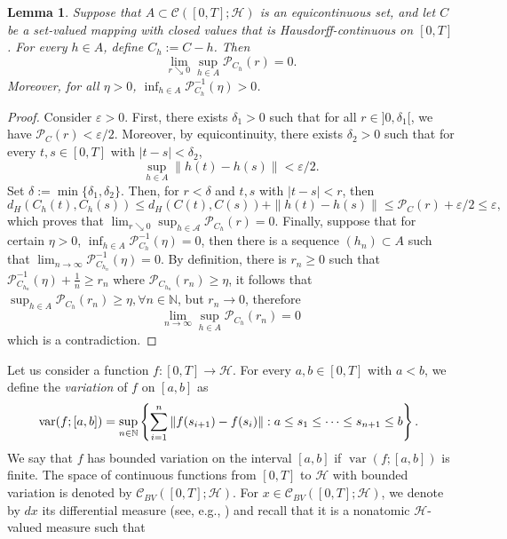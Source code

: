 \documentclass[preprint,12pt]{elsarticle}
\renewcommand{\epsilon}{\varepsilon}
\renewcommand{\H}{\mathcal{H}}
\newcommand{\N}{\mathbb{N}}
\theoremstyle{plain}
\newtheorem{lemma}[theorem]{Lemma}
\theoremstyle{definition}
\theoremstyle{remark}
\begin{document}
    \begin{lemma}\label{lem-equi-mc}
		Suppose that $A\subset \mathcal{C}([0,T];\H)$ is an equicontinuous set, and let $C$ be a set-valued mapping with closed values that is Hausdorff-continuous on $[0,T]$. For every $h\in A$, define $C_h := C-h$. Then $$\lim_{r\searrow 0}\sup_{h\in A}\mathscr{P}_{C_h}(r) = 0.$$
        Moreover, for all $\eta>0$, $\displaystyle\inf_{h\in A} \mathscr{P}_{C_h}^{-1}(\eta)>0$.
	\end{lemma}
	\begin{proof}
	Consider $\epsilon>0$. First, there exists $\delta_1>0$ such that for all $r\in ]0,\delta_1[$, we have $\mathscr{P}_C(r)<\epsilon/2$. Moreover, by equicontinuity, there exists $\delta_2>0$ such that for every $t,s\in [0,T]$ with $|t-s|<\delta_2$, $$\sup_{h\in A}\|h(t)-h(s)\|<\epsilon/2.$$
    Set $\delta:=\min\{\delta_1,\delta_2\}$. Then, for $r<\delta$ and $t,s$ with $|t-s|< r$, then
		\begin{equation*}
			d_H(C_h(t),C_h(s)) \leq d_H(C(t),C(s)) + \|h(t)-h(s)\|
			\leq \mathscr{P}_C(r) + \epsilon/2\leq \epsilon,
		\end{equation*}
		which proves that $\displaystyle\lim_{r\searrow 0}\sup_{h\in \mathcal{A}}\mathscr{P}_{C_h}(r) = 0$. Finally, suppose that for certain $\eta>0$, $\inf_{h\in A} \mathscr{P}_{C_h}^{-1}(\eta)=0$, then there is a sequence $(h_n)\subset A$ such that $\displaystyle\lim_{n\to \infty}\mathscr{P}_{C_{h_n}}^{-1}(\eta)=0$. By definition, there is $r_n\geq 0$ such that $\mathscr{P}_{C_{h_n}}^{-1}(\eta) + \frac{1}{n}\geq r_n$ where $\mathscr{P}_{C_{h_n}}(r_n)\geq \eta$, it follows that $\sup_{h\in A} \mathscr{P}_{C_{h}}(r_n)\geq \eta, \forall n\in \N$, but $r_n\to 0$, therefore $$\displaystyle\lim_{n\to\infty} \sup_{h\in A} \mathscr{P}_{C_{h}}(r_n) = 0$$ which is a contradiction. 
	\end{proof}
    Let us consider a function $f\colon [0,T]\to \H$. For every $a,b\in [0,T]$ with $a<b$,  we define the \emph{variation} of $f$ on $[a,b]$ as 
    $$
    \hspace{-1mm}\operatorname{var}(f;[a,b]) = \sup_{n\in \N}\left\{ \sum_{i=1}^n\|f(s_{i+1})-f(s_i)\| : a\leq s_1\leq \cdots\leq s_{n+1}\leq b \right\}.
    $$
    We say that $f$ has bounded variation on the interval $[a,b]$ if $\operatorname{var}(f;[a,b])$ is finite. The space of continuous functions from $[0,T]$ to $\H$ with bounded variation is denoted by $\mathcal{C}_{BV}([0,T];\H)$. For $x\in \mathcal{C}_{BV}([0,T];\H)$, we denote by \( dx \) its differential measure (see, e.g., \cite[Theorem 1, p. 358]{MR206190}) and recall that it is a nonatomic \( \H \)-valued measure such that 
\end{document}
